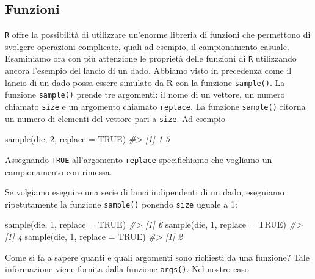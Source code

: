 \documentclass[
]{memoir}
\newenvironment{Shaded}{\begin{snugshade}}{\end{snugshade}}
\newcommand{\AttributeTok}[1]{\textcolor[rgb]{0.77,0.63,0.00}{#1}}
\newcommand{\CommentTok}[1]{\textcolor[rgb]{0.56,0.35,0.01}{\textit{#1}}}
\newcommand{\ConstantTok}[1]{\textcolor[rgb]{0.00,0.00,0.00}{#1}}
\newcommand{\DecValTok}[1]{\textcolor[rgb]{0.00,0.00,0.81}{#1}}
\newcommand{\FunctionTok}[1]{\textcolor[rgb]{0.00,0.00,0.00}{#1}}
\newcommand{\NormalTok}[1]{#1}
\theoremstyle{definition}
\theoremstyle{definition}
\theoremstyle{definition}
\theoremstyle{definition}
\theoremstyle{remark}
\begin{document}
\hypertarget{funzioni}{%
\subsection{Funzioni}\label{funzioni}}

\texttt{R} offre la possibilità di utilizzare un'enorme libreria di funzioni che
permettono di svolgere operazioni complicate, quali ad esempio, il
campionamento casuale. Esaminiamo ora con più attenzione le proprietà
delle funzioni di \texttt{R} utilizzando ancora l'esempio del lancio di un dado.
Abbiamo visto in precedenza come il lancio di un dado possa essere
simulato da R con la funzione \texttt{sample()}. La funzione \texttt{sample()} prende
tre argomenti: il nome di un vettore, un numero chiamato \texttt{size} e un
argomento chiamato \texttt{replace}. La funzione \texttt{sample()} ritorna un numero
di elementi del vettore pari a \texttt{size}. Ad esempio

\begin{Shaded}
\begin{Highlighting}[]
\FunctionTok{sample}\NormalTok{(die, }\DecValTok{2}\NormalTok{, }\AttributeTok{replace =} \ConstantTok{TRUE}\NormalTok{)}
\CommentTok{\#\textgreater{} [1] 1 5}
\end{Highlighting}
\end{Shaded}

Assegnando \texttt{TRUE} all'argomento \texttt{replace} specifichiamo che vogliamo un
campionamento con rimessa.

Se volgiamo eseguire una serie di lanci indipendenti di un dado,
eseguiamo ripetutamente la funzione \texttt{sample()} ponendo \texttt{size} uguale a
1:

\begin{Shaded}
\begin{Highlighting}[]
\FunctionTok{sample}\NormalTok{(die, }\DecValTok{1}\NormalTok{, }\AttributeTok{replace =} \ConstantTok{TRUE}\NormalTok{)}
\CommentTok{\#\textgreater{} [1] 6}
\FunctionTok{sample}\NormalTok{(die, }\DecValTok{1}\NormalTok{, }\AttributeTok{replace =} \ConstantTok{TRUE}\NormalTok{)}
\CommentTok{\#\textgreater{} [1] 4}
\FunctionTok{sample}\NormalTok{(die, }\DecValTok{1}\NormalTok{, }\AttributeTok{replace =} \ConstantTok{TRUE}\NormalTok{)}
\CommentTok{\#\textgreater{} [1] 2}
\end{Highlighting}
\end{Shaded}

Come si fa a sapere quanti e quali argomenti sono richiesti da una
funzione? Tale informazione viene fornita dalla funzione \texttt{args()}. Nel
nostro caso
\end{document}
